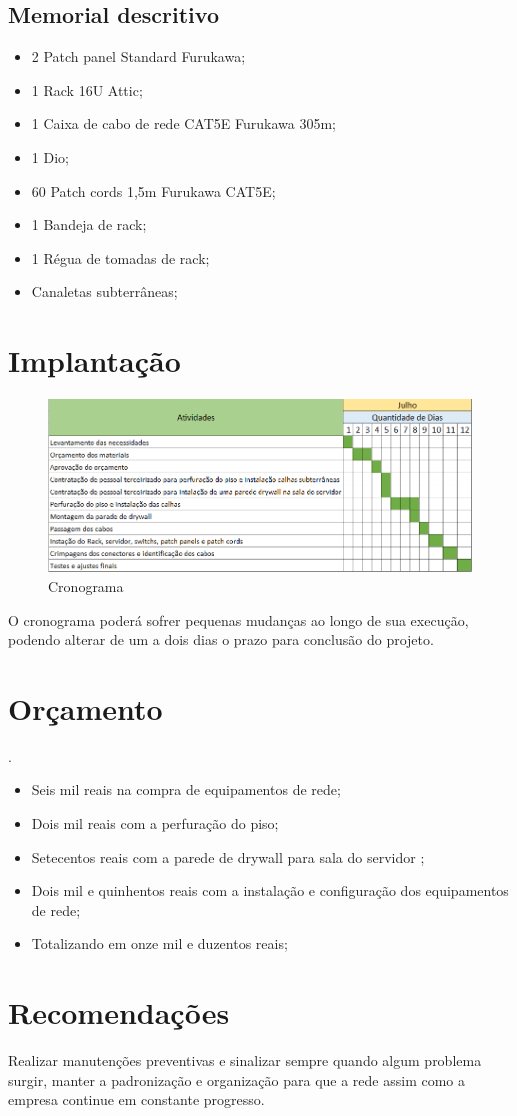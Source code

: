 \documentclass[	DIV=calc,%
							paper=a4,%
							fontsize=12pt,%
							onecolumn]{scrartcl}	 					%
\begin{document}
	

\subsection{Memorial descritivo}

\begin{itemize}
	\item 2 Patch panel Standard Furukawa;
	\item 1 Rack 16U Attic;
 	\item 1 Caixa de cabo de rede CAT5E Furukawa 305m;
 	\item 1 Dio;
 	\item 60 Patch cords 1,5m Furukawa CAT5E;
 	\item 1 Bandeja de rack;
 	\item 1 Régua de tomadas de rack;
 	\item Canaletas subterrâneas;
  	 
\end{itemize}



\section{Implantação}

\begin{figure}[H]
	\centering
	\includegraphics[scale=0.6]{fig6}
	\caption{Cronograma}
	\label{fig6}
	\end{figure}
  	 
  	 O cronograma poderá sofrer pequenas mudanças ao longo de sua execução, podendo alterar de um a dois dias o prazo para conclusão do projeto.

\section{Orçamento}.

\begin{itemize}
	\item Seis mil reais na compra de equipamentos de rede;
	\item Dois mil reais com a perfuração do piso;
 	\item Setecentos reais com a parede de drywall para sala do servidor ;
 	\item Dois mil e quinhentos reais com a instalação e configuração dos 			  equipamentos de rede;
 	\item Totalizando em onze mil e duzentos reais;
\end{itemize}

 	
\section{Recomendações}
Realizar manutenções preventivas e sinalizar sempre quando algum problema surgir, manter a padronização e organização para que a rede assim como a empresa continue em constante progresso.
 
\end{document}
